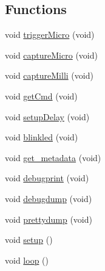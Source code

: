 \subsection*{Functions}
\begin{DoxyCompactItemize}
\item 
void \hyperlink{logic__analyzer_8ino_a82a3ded09d06397be48af31ec6610f6d}{trigger\-Micro} (void)
\item 
void \hyperlink{logic__analyzer_8ino_ab7cc96544e6c48ee905460501ceba639}{capture\-Micro} (void)
\item 
void \hyperlink{logic__analyzer_8ino_a58ca90e949b84cf8f2ec0c32ef617663}{capture\-Milli} (void)
\item 
void \hyperlink{logic__analyzer_8ino_a7a7c7f1690c2d8fca30ce97777cfb923}{get\-Cmd} (void)
\item 
void \hyperlink{logic__analyzer_8ino_ac475c02d08944ced22be44c29396f37d}{setup\-Delay} (void)
\item 
void \hyperlink{logic__analyzer_8ino_aeb0f8e9c281b659b5b7fde75590ea28d}{blinkled} (void)
\item 
void \hyperlink{logic__analyzer_8ino_a90d67429d139ee677f1f9921090df6c3}{get\-\_\-metadata} (void)
\item 
void \hyperlink{logic__analyzer_8ino_a16e966cfeb510046fb0af78ba0f1f822}{debugprint} (void)
\item 
void \hyperlink{logic__analyzer_8ino_ab01679d87135b0e7cd6092519442a2e3}{debugdump} (void)
\item 
void \hyperlink{logic__analyzer_8ino_afb231797b48f7b822159311cba64d114}{prettydump} (void)
\item 
void \hyperlink{logic__analyzer_8ino_a4fc01d736fe50cf5b977f755b675f11d}{setup} ()
\item 
void \hyperlink{logic__analyzer_8ino_afe461d27b9c48d5921c00d521181f12f}{loop} ()
\end{DoxyCompactItemize}
